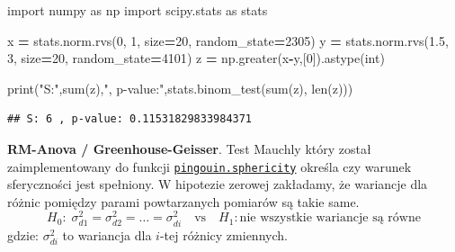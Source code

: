 \documentclass[polish,]{book}
\newenvironment{Shaded}{\begin{snugshade}}{\end{snugshade}}
\newcommand{\BuiltInTok}[1]{#1}
\newcommand{\DecValTok}[1]{\textcolor[rgb]{0.00,0.00,0.81}{#1}}
\newcommand{\FloatTok}[1]{\textcolor[rgb]{0.00,0.00,0.81}{#1}}
\newcommand{\ImportTok}[1]{#1}
\newcommand{\NormalTok}[1]{#1}
\newcommand{\OperatorTok}[1]{\textcolor[rgb]{0.81,0.36,0.00}{\textbf{#1}}}
\newcommand{\StringTok}[1]{\textcolor[rgb]{0.31,0.60,0.02}{#1}}
\begin{document}
\begin{Shaded}
\begin{Highlighting}[]
\ImportTok{import}\NormalTok{ numpy }\ImportTok{as}\NormalTok{ np}
\ImportTok{import}\NormalTok{ scipy.stats }\ImportTok{as}\NormalTok{ stats}

\NormalTok{x }\OperatorTok{=}\NormalTok{ stats.norm.rvs(}\DecValTok{0}\NormalTok{, }\DecValTok{1}\NormalTok{, size}\OperatorTok{=}\DecValTok{20}\NormalTok{, random_state}\OperatorTok{=}\DecValTok{2305}\NormalTok{)}
\NormalTok{y }\OperatorTok{=}\NormalTok{ stats.norm.rvs(}\FloatTok{1.5}\NormalTok{, }\DecValTok{3}\NormalTok{, size}\OperatorTok{=}\DecValTok{20}\NormalTok{, random_state}\OperatorTok{=}\DecValTok{4101}\NormalTok{)}
\NormalTok{z }\OperatorTok{=}\NormalTok{ np.greater(x}\OperatorTok{-}\NormalTok{y,[}\DecValTok{0}\NormalTok{]).astype(}\BuiltInTok{int}\NormalTok{)}

\BuiltInTok{print}\NormalTok{(}\StringTok{"S:"}\NormalTok{,}\BuiltInTok{sum}\NormalTok{(z),}\StringTok{", p-value:"}\NormalTok{,stats.binom_test(}\BuiltInTok{sum}\NormalTok{(z), }\BuiltInTok{len}\NormalTok{(z)))}
\end{Highlighting}
\end{Shaded}

\begin{verbatim}
## S: 6 , p-value: 0.11531829833984371
\end{verbatim}

\textbf{RM-Anova / Greenhouse-Geisser}. Test Mauchly który został zaimplementowany do funkcji
\href{https://pingouin-stats.org/generated/pingouin.sphericity.html\#pingouin.sphericity}{\texttt{pingouin.sphericity}} określa czy warunek sferyczności jest spełniony. W hipotezie zerowej zakładamy, że
wariancje dla różnic pomiędzy parami powtarzanych pomiarów są takie same.
\begin{equation}
H_0:\;\sigma^2_{d1}=\sigma^2_{d2}=\ldots=\sigma^2_{di}\quad\mbox{vs}\quad H_1:\mbox{nie wszystkie wariancje są równe}
\label{eq:dep02}
\end{equation}
gdzie: \(\sigma^2_{di}\) to wariancja dla \(i\)-tej różnicy zmiennych.
\end{document}

